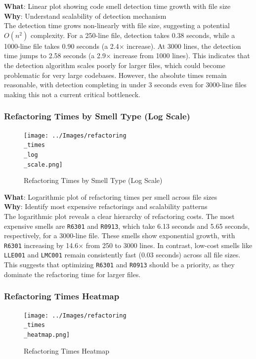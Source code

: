 \documentclass[12pt, titlepage]{article}
\begin{document}
\noindent \textbf{What}: Linear plot showing code smell detection
time growth with file size\\

\noindent \textbf{Why}: Understand scalability of detection mechanism\\

The detection time grows non-linearly with file size, suggesting a
potential \(O(n^2)\) complexity.
For a 250-line file, detection takes 0.38 seconds, while a 1000-line
file takes 0.90 seconds (a 2.4×
increase). At 3000 lines, the detection time jumps to 2.58 seconds (a
2.9× increase from 1000 lines).
This indicates that the detection algorithm scales poorly for larger
files, which could become
problematic for very large codebases. However, the absolute times
remain reasonable, with detection
completing in under 3 seconds even for 3000-line files making this
not a current critical bottleneck.

\subsubsection{Refactoring Times by Smell Type (Log Scale)}
\begin{figure}[H]
  \centering
  \texttt{[image: ../Images/refactoring\\\_times\\\_log\\\_scale.png]}
  \caption{Refactoring Times by Smell Type (Log Scale)}
\end{figure}

\noindent \textbf{What}: Logarithmic plot of refactoring times per
smell across file sizes\\

\noindent \textbf{Why}: Identify most expensive refactorings and
scalability patterns\\

The logarithmic plot reveals a clear hierarchy of refactoring costs.
The most expensive smells are \texttt{R6301} and \texttt{R0913},
which take 6.13 seconds and 5.65 seconds, respectively, for a
3000-line file. These smells show exponential growth, with
\texttt{R6301} increasing by 14.6× from 250 to 3000 lines. In
contrast, low-cost smells like \texttt{LLE001} and \texttt{LMC001}
remain consistently fast (0.03 seconds) across all file sizes. This
suggests that optimizing \texttt{R6301} and \texttt{R0913} should be
a priority, as they dominate the refactoring time for larger files.

\subsubsection{Refactoring Times Heatmap}
\begin{figure}[H]
  \centering
  \texttt{[image: ../Images/refactoring\\\_times\\\_heatmap.png]}
  \caption{Refactoring Times Heatmap}
\end{figure}
\end{document}
